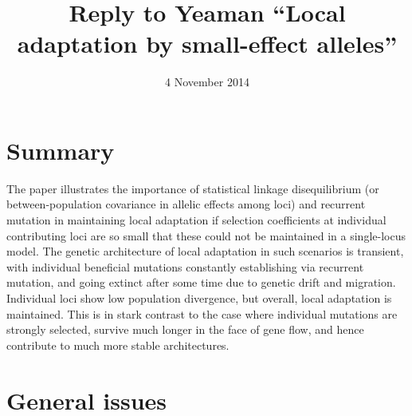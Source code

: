 \documentclass[11pt]{article}
\title{Reply to Yeaman ``Local adaptation by small-effect alleles''}
\date{4 November 2014}                                           %
\begin{document}
\maketitle

\section{Summary}
The paper illustrates the importance of statistical linkage disequilibrium (or between-population covariance in allelic effects among loci) and recurrent mutation in maintaining local adaptation if selection coefficients at individual contributing loci are so small that these could not be maintained in a single-locus model. The genetic architecture of local adaptation in such scenarios is transient, with individual beneficial mutations constantly establishing via recurrent mutation, and going extinct after some time due to genetic drift and migration. Individual loci show low population divergence, but overall, local adaptation is maintained. This is in stark contrast to the case where individual mutations are strongly selected, survive much longer in the face of gene flow, and hence contribute to much more stable architectures.

\section{General issues}
\end{document}
